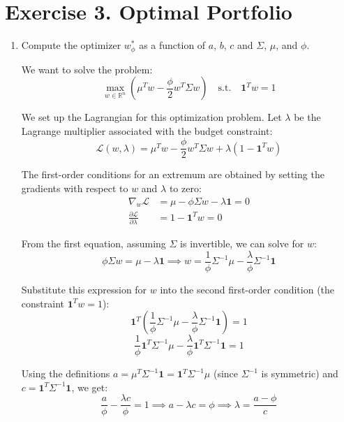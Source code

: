 \section{Exercise 3. Optimal Portfolio}

\begin{enumerate}
      \item Compute the optimizer $w_{\phi}^{*}$ as a function of $a$, $b$, $c$ and $\Sigma$, $\mu$, and $\phi$.

            We want to solve the problem:
            \[ \max_{w\in\mathbb{R}^{n}} \left( \mu^{T}w - \frac{\phi}{2}w^{T}\Sigma w \right) \quad \text{s.t.} \quad \mathbf{1}^{T}w = 1 \]

            We set up the Lagrangian for this optimization problem. Let $\lambda$ be the Lagrange multiplier associated with the budget constraint:
            \[ \mathcal{L}(w, \lambda) = \mu^{T}w - \frac{\phi}{2}w^{T}\Sigma w + \lambda (1 - \mathbf{1}^{T}w) \]

            The first-order conditions for an extremum are obtained by setting the gradients with respect to $w$ and $\lambda$ to zero:
            \begin{align*}
                  \nabla_{w}\mathcal{L}                         & = \mu - \phi \Sigma w - \lambda \mathbf{1} = 0 \\
                  \frac{\partial \mathcal{L}}{\partial \lambda} & = 1 - \mathbf{1}^{T}w = 0
            \end{align*}

            From the first equation, assuming $\Sigma$ is invertible, we can solve for $w$:
            \[ \phi \Sigma w = \mu - \lambda \mathbf{1} \implies w = \frac{1}{\phi}\Sigma^{-1}\mu - \frac{\lambda}{\phi}\Sigma^{-1}\mathbf{1} \]

            Substitute this expression for $w$ into the second first-order condition (the constraint $\mathbf{1}^{T}w = 1$):
            \[ \mathbf{1}^{T} \left( \frac{1}{\phi}\Sigma^{-1}\mu - \frac{\lambda}{\phi}\Sigma^{-1}\mathbf{1} \right) = 1 \]
            \[ \frac{1}{\phi}\mathbf{1}^{T}\Sigma^{-1}\mu - \frac{\lambda}{\phi}\mathbf{1}^{T}\Sigma^{-1}\mathbf{1} = 1 \]

            Using the definitions $a = \mu^{T}\Sigma^{-1}\mathbf{1} = \mathbf{1}^{T}\Sigma^{-1}\mu$ (since $\Sigma^{-1}$ is symmetric) and $c = \mathbf{1}^{T}\Sigma^{-1}\mathbf{1}$, we get:
            \[ \frac{a}{\phi} - \frac{\lambda c}{\phi} = 1 \implies a - \lambda c = \phi \implies \lambda = \frac{a - \phi}{c} \]


\end{enumerate}
